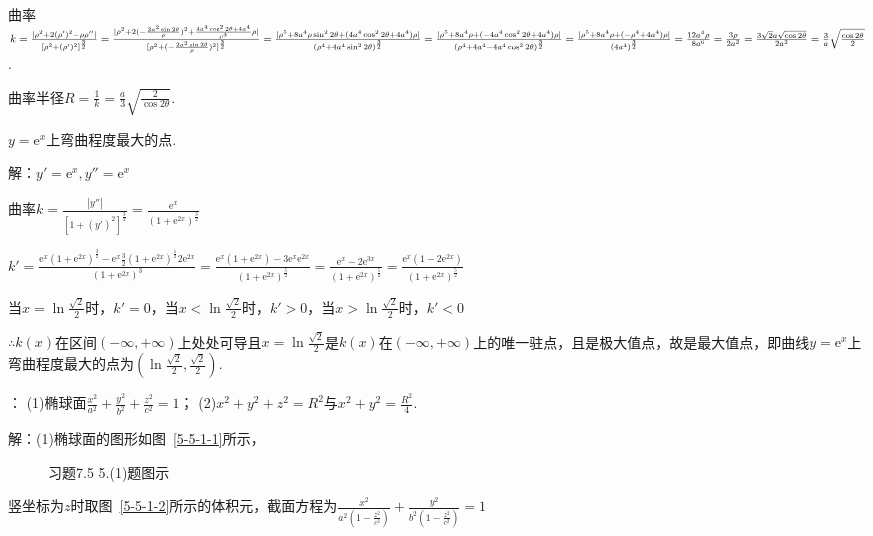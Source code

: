 \documentclass[12pt,UTF8]{ctexart}
\begin{document}
\begin{enumerate}
曲率$k=\frac{|\rho^2+2(\rho')^2-\rho\rho''|}{[\rho^2+(\rho')^2]^{\frac32}}=\frac{|\rho^2+2(-\frac{2a^2\sin2\theta}\rho)^2+\frac{4a^4\cos^22\theta+4a^4}{\rho^3}\rho|}{[\rho^2+(-\frac{2a^2\sin2\theta}\rho)^2]^{\frac32}}=\frac{|\rho^5+8a^4\rho\sin^22\theta+(4a^4\cos^22\theta+4a^4)\rho|}{(\rho^4+4a^4\sin^22\theta)^{\frac32}}\\
=\frac{|\rho^5+8a^4\rho+(-4a^4\cos^22\theta+4a^4)\rho|}{(\rho^4+4a^4-4a^4\cos^22\theta)^{\frac32}}=\frac{|\rho^5+8a^4\rho+(-\rho^4+4a^4)\rho|}{(4a^4)^{\frac32}}=\frac{12a^4\rho}{8a^6}=\frac{3\rho}{2a^2}=\frac{3\sqrt2a\sqrt{\cos2\theta}}{2a^2}=\frac3a\sqrt{\frac{\cos2\theta}2}$.

曲率半径$R=\frac1k=\frac a3\sqrt{\frac2{\cos2\theta}}$.

$y=\mathrm e^x$上弯曲程度最大的点.

解：$y'=\mathrm e^x,y''=\mathrm e^x$

曲率$k=\frac{|y''|}{[1+(y')^2]^{\frac32}}=\frac{\mathrm e^x}{(1+\mathrm e^{2x})^{\frac32}}$

$k'=\frac{\mathrm e^x(1+\mathrm e^{2x})^{\frac32}-\mathrm e^x\frac32(1+\mathrm e^{2x})^{\frac12}2\mathrm e^{2x}}{(1+\mathrm e^{2x})^3}=\frac{\mathrm e^x(1+\mathrm e^{2x})-3\mathrm e^x\mathrm e^{2x}}{(1+\mathrm e^{2x})^{\frac52}}=\frac{\mathrm e^x-2\mathrm e^{3x}}{(1+\mathrm e^{2x})^{\frac52}}=\frac{\mathrm e^x(1-2\mathrm e^{2x})}{(1+\mathrm e^{2x})^{\frac52}}$

当$x=\ln\frac{\sqrt2}2$时，$k'=0$，当$x<\ln\frac{\sqrt2}2$时，$k'>0$，当$x>\ln\frac{\sqrt2}2$时，$k'<0$

$\therefore k(x)$在区间$(-\infty,+\infty)$上处处可导且$x=\ln\frac{\sqrt2}2$是$k(x)$在$(-\infty,+\infty)$上的唯一驻点，且是极大值点，故是最大值点，即曲线$y=\mathrm e^x$上弯曲程度最大的点为$(\ln\frac{\sqrt2}2,\frac{\sqrt2}2)$.

：
\newline
(1)椭球面$\frac{x^2}{a^2}+\frac{y^2}{b^2}+\frac{z^2}{c^2}=1$；
\newline
(2)$x^2+y^2+z^2=R^2$与$x^2+y^2=\frac{R^2}4$.

解：(1)椭球面的图形如图~\ref{5-5-1-1}所示，
\begin{figure}[H]
\begin{center}
\end{center}
\caption{习题7.5 5.(1)题图示}
\label{5-5-1}
\end{figure}
竖坐标为$z$时取图~\ref{5-5-1-2}所示的体积元，截面方程为$\frac{x^2}{a^2(1-\frac{z^2}{c^2})}+\frac{y^2}{b^2(1-\frac{z^2}{c^2})}=1$


\end{enumerate}
\end{document}
